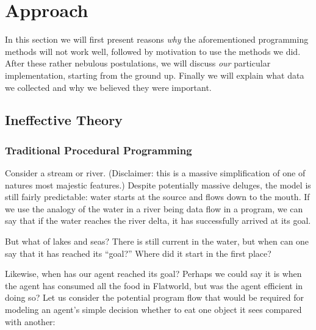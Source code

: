 \section{Approach} \label{sec:Approach}

In this section we will first present reasons \emph{why} the aforementioned
programming methods will not work well, followed by motivation to use the
methods we did. After these rather nebulous postulations, we will discuss
\emph{our} particular implementation, starting from the ground up. Finally
we will explain what data we collected and why we believed they were important.

\subsection{Ineffective Theory}

\subsubsection{Traditional Procedural Programming}
Consider a stream or river. (Disclaimer: this is a massive simplification of
one of natures most majestic features.) Despite potentially massive deluges, 
the model is still fairly predictable: water starts at the source and flows 
down to the mouth. If we use the analogy of the water in a river being data 
flow in a program, we can say that if the water reaches the river delta, it
has successfully arrived at its goal.

But what of lakes and seas? There is still current in the water, but when
can one say that it has reached its ``goal?'' Where did it start in the first
place?

Likewise, when has our agent reached its goal? Perhaps we could say it is 
when the agent has consumed all the food in Flatworld, but was the agent 
efficient in doing so? Let us consider the potential program flow that
would be required for modeling an agent's simple decision whether to eat one
object it sees compared with another:

